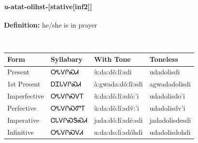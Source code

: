 \paragraph*{\textit{u}{-}atat{-}\textbf{olihst}{-}[stative[inf2]]}
\nopagebreak
\textbf{Definition: } he/she is in prayer
\\[0.5em]
\begin{tabularx}{\textwidth}{l X X X}%
\toprule%
\textbf{Form}&\textbf{Syllabary}&\textbf{With Tone}&\textbf{Toneless}\\%
\midrule%
Present&ᎤᏓᏙᎵᏍᏗ&ù:da:dǒ:lî:sdi&udadolisdi\\%
1st Present&ᎠᏆᏓᏙᎵᏍᏗ&à:gwada:dǒ:lî:sdi&agwadadolisdi\\%
Imperfective&ᎤᏓᏙᎵᏍᏙᎢ&ù:da:dǒ:lî:sdó:’i&udadolisdo’i\\%
Perfective&ᎤᏓᏙᎵᏍᏛᎢ&ù:da:dǒ:lî:sdv̌:’i&udadolisdv’i\\%
Imperative&ᏣᏓᏙᎵᏍᏕᏍᏗ&jada:dǒ:lî:sdé:sdi&jadadolisdesdi\\%
Infinitive&ᎤᏓᏙᎵᏍᏙᏗ&u:da:do:lì:sdóhdi&udadolisdohdi\\%
\bottomrule%
\end{tabularx}
\\[1em]